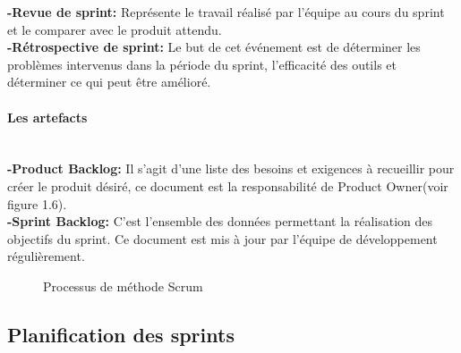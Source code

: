 \noindent \textbf{\Large -Revue de sprint: }  Représente le travail réalisé par l’équipe au cours du sprint et le comparer avec le produit attendu.\\[0.1cm]

\noindent \textbf{\Large -Rétrospective de sprint: } Le but de cet événement est de déterminer les problèmes intervenus dans la période du sprint, l’efficacité des outils et déterminer ce qui peut être amélioré.

\paragraph{ \selectfont\Large Les artefacts}
\texttt{}\\[0.2cm]
\noindent \textbf{\Large -Product Backlog: }
  Il s’agit d’une liste des besoins et exigences à recueillir pour créer le produit désiré, ce document est la responsabilité de Product Owner(voir figure 1.6).\\[0.1cm]

\noindent \textbf{\Large -Sprint Backlog: } C’est l’ensemble des données permettant la réalisation des objectifs du sprint. Ce document est mis à jour par l’équipe de développement régulièrement.

\begin{figure}[H]
    \begin{center}
    \end{center}
    \caption{Processus de méthode Scrum}
\end{figure}


\subsection{\selectfont\Large Planification des sprints}
 
